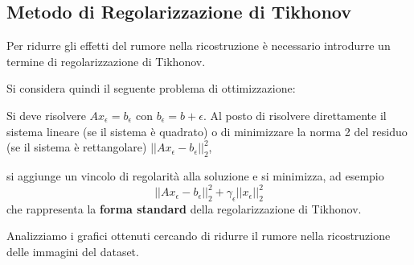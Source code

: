 \subsection{Metodo di Regolarizzazione di Tikhonov}
Per ridurre gli effetti del rumore nella ricostruzione è necessario introdurre un termine di regolarizzazione di Tikhonov. 

Si considera quindi il seguente problema di ottimizzazione:

Si deve risolvere $Ax_\epsilon = b_\epsilon$ con $b_\epsilon = b+\epsilon$. 
Al posto di risolvere direttamente il sistema lineare (se il sistema è quadrato) o di minimizzare la norma 2 del residuo 
(se il sistema è rettangolare)  $||Ax_\epsilon -b_\epsilon||_2^2$, %

si aggiunge un vincolo di regolarità alla soluzione e si minimizza, ad esempio 
\[||Ax_\epsilon-b_\epsilon||_2^2+\gamma_\epsilon||x_\epsilon||_2^2\] che rappresenta la \textbf{forma standard} 
della regolarizzazione di Tikhonov.

Analizziamo i grafici ottenuti cercando di ridurre il rumore nella ricostruzione delle immagini del dataset. 

